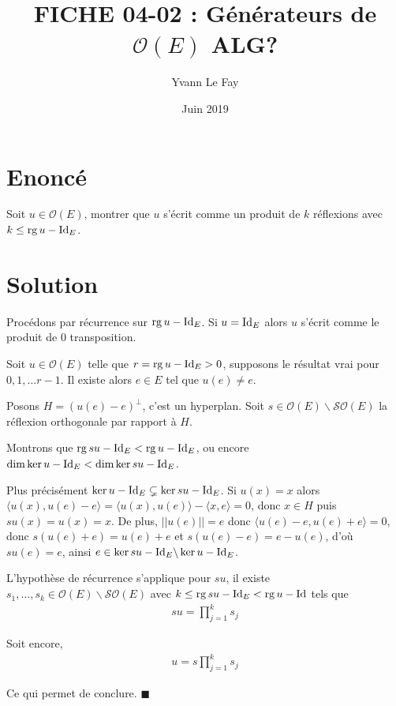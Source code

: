 \documentclass{article}
\newcommand*{\QED}{\hfill\ensuremath{\blacksquare}}%
\DeclareMathOperator{\rg}{rg}
\begin{document}
\title{FICHE 04-02 : Générateurs de $\mathcal{O}(E)$ ALG? }
\author{Yvann Le Fay}
\date{Juin 2019}
\maketitle

\section*{Enoncé}
Soit $u\in \mathcal{O}(E)$, montrer que $u$ s'écrit comme un produit de $k$ réflexions avec $k\leq \rg{u-\textup{Id}_E}$. 
\section*{Solution}
Procédons par récurrence sur $\rg{u-\textup{Id}_E}$. Si $u=\textup{Id}_E$ alors $u$ s'écrit comme le produit de $0$ transposition. 

Soit $u\in \mathcal{O}(E)$ telle que $r = \rg u-\textup{Id}_E > 0$, supposons le résultat vrai pour $0,1,\ldots r-1$. Il existe alors $e\in E$ tel que $u(e)\neq e$. 

Posons $H = (u(e)-e)^{\perp}$, c'est un hyperplan. Soit $s \in \mathcal{O}(E)\backslash \mathcal{S}\mathcal{O}(E)$ la réflexion orthogonale par rapport à $H$.

Montrons que $\rg su-\textup{Id}_E < \rg u-\textup{Id}_E$, ou encore $\dim \ker u-\textup{Id}_E < \dim \ker su-\textup{Id}_E$. 

Plus précisément $\ker u-\textup{Id}_E \subsetneq \ker su-\textup{Id}_E$. Si $u(x)=x$ alors $\langle u(x), u(e)-e\rangle = \langle u(x), u(e)\rangle-\langle x, e\rangle = 0$, donc $x\in H$ puis $su(x)=u(x)=x$. De plus, $||u(e)||=e$ donc $\langle u(e)-e, u(e)+e\rangle = 0$, donc $s(u(e)+e) = u(e)+e$  et $s(u(e)-e)=e-u(e)$, d'où $su(e)=e$, ainsi $e\in \ker su-\textup{Id}_E\backslash \ker u-\textup{Id}_E$. 

L'hypothèse de récurrence s'applique pour $su$, il existe $s_1,\ldots,s_k\in \mathcal{O}(E)\backslash \mathcal{S}\mathcal{O}(E)$ avec $k\leq \rg su-\textup{Id}_E<\rg u -\textup{Id}$ tels que
\begin{align*}
su = \prod_{j=1}^k s_j
\end{align*}

Soit encore, 
\begin{align*}
u = s\prod_{j=1}^k s_j
\end{align*}

Ce qui permet de conclure.
\QED
\end{document}
